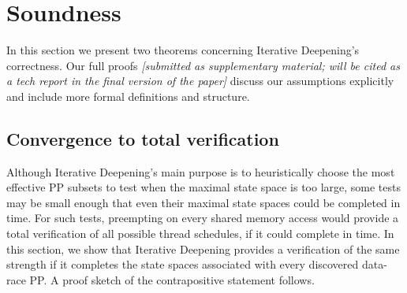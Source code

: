 \section{Soundness}
\label{sec:soundness}

In this section we present two theorems concerning Iterative Deepening's correctness.
Our full proofs
{\em [submitted as supplementary material; will be cited as a tech report in the final version of the paper]}
discuss our assumptions explicitly and include more formal definitions and structure.

\renewcommand\proofname{Proof Sketch}


\subsection{Convergence to total verification}
\label{sec:totalverif}

Although Iterative Deepening's main purpose is to heuristically choose the most effective PP subsets to test
when the maximal state space is too large,
some tests may be small enough that even their maximal state spaces could be completed in time.
For such tests, preempting on every shared memory access \cite{spin,inspect} would provide a total verification of all possible thread schedules, if it could complete in time.
In this section, we show that Iterative Deepening provides a verification of the same strength if it completes the state spaces associated with every discovered data-race PP.
A proof sketch of the contrapositive statement follows.

